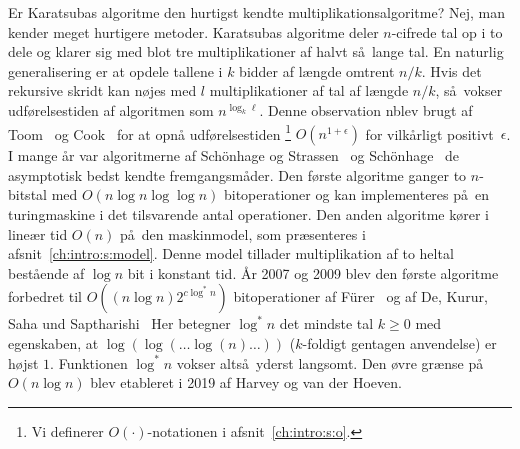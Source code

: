 Er Karatsubas algoritme den hurtigst kendte multiplikationsalgoritme?
Nej, man kender meget hurtigere metoder.
Karatsubas algoritme deler $n$-cifrede tal op i to dele og klarer sig med blot tre multiplikationer af halvt så lange tal.
En naturlig generalisering er at opdele tallene i $k$ bidder af længde omtrent $n/k$. 
Hvis det rekursive skridt kan nøjes med $l$ multiplikationer af tal af længde $n/k$, så vokser udførelsestiden af algoritmen som $n^{\log_k \ell}$. 
Denne observation nblev brugt af Toom~\cite{Toom} og Cook~\cite{Cook} for at opnå udførelsestiden
\footnote{Vi definerer $O(\cdot)$-notationen i afsnit~\protect\ref{ch:intro:s:o}.}  
$O(n^{ 1 + \epsilon})$ for vilkårligt positivt~$\epsilon$. 
I mange år var algoritmerne af Sch\"{o}nhage og Strassen~\cite{SchStr71}
 og
Sch\"{o}nhage~\cite{Schoenhage} de asymptotisk bedst kendte fremgangsmåder. 
Den første algoritme ganger to $n$-bitstal med $O(n \log n \log\log n)$ bitoperationer og kan implementeres på en turingmaskine i det tilsvarende antal operationer.
Den anden algoritme kører i lineær tid $O(n)$ på den maskinmodel, som præsenteres i afsnit~\ref{ch:intro:s:model}.
Denne model tillader multiplikation af to heltal bestående af $\log n$ bit i konstant tid.
År 2007 og 2009 blev den første algoritme forbedret til  $O((n \log n) 2^{c\log^* n})$ bitoperationer af
F{\"u}rer~\cite{Furer09}
og af De, Kurur, Saha und Saptharishi~\cite{DeKSS13}
%
Her betegner $\log^*n$  det mindste tal $k\ge0$ med egenskaben, at $\log(\log(\dots\log(n)\dots))$ ($k$-foldigt gentagen anvendelse) er højst $1$.
Funktionen $\log^*n$ vokser altså yderst langsomt.
Den øvre grænse på $O(n\log n)$ blev etableret i 2019 af Harvey og van der Hoeven.
 

